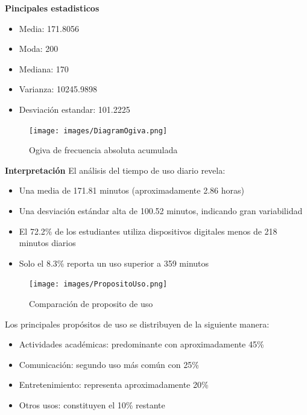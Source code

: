 \documentclass[12pt, a4paper]{article}
\begin{document}
\textbf{Pincipales estadisticos}

\begin{itemize}
    \item Media: 171.8056
    \item Moda: 200
    \item Mediana: 170
    \item Varianza: 10245.9898
    \item Desviación estandar: 101.2225
\end{itemize}

\begin{figure}[H]
    \begin{center}
        \texttt{[image: images/DiagramOgiva.png]}
    \end{center}
    \label{fig:DiagramOgiva}
    \caption{Ogiva de frecuencia absoluta acumulada}
\end{figure}

\textbf{Interpretación}
El análisis del tiempo de uso diario revela:
\begin{itemize}
    \item Una media de 171.81 minutos (aproximadamente 2.86 horas)
    \item Una desviación estándar alta de 100.52 minutos, indicando gran variabilidad
    \item El 72.2\% de los estudiantes utiliza dispositivos digitales menos de 218 minutos diarios
    \item Solo el 8.3\% reporta un uso superior a 359 minutos
\end{itemize}

\begin{figure}[H]
    \begin{center}
        \texttt{[image: images/PropositoUso.png]}
    \end{center}
    \label{fig:PropositoUso}
    \caption{Comparación de proposito de uso}
\end{figure}

Los principales propósitos de uso se distribuyen de la siguiente manera:
\begin{itemize}
    \item Actividades académicas: predominante con aproximadamente 45\%
    \item Comunicación: segundo uso más común con 25\%
    \item Entretenimiento: representa aproximadamente 20\%
    \item Otros usos: constituyen el 10\% restante
\end{itemize}
\end{document}
